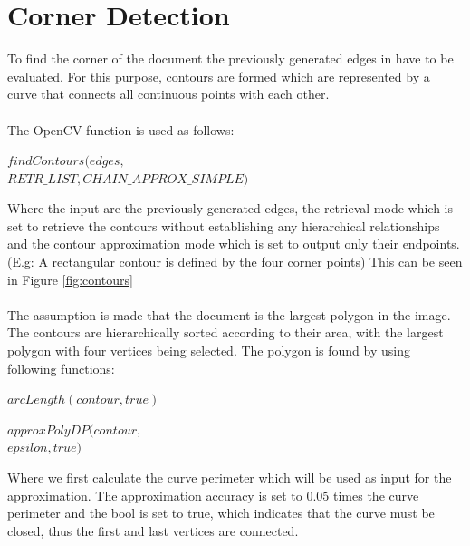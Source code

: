 \documentclass[twocolumn,10pt]{asme2ej}
\begin{document}
\section{Corner Detection}
\noindent
To find the corner of the document the previously generated edges 
in  have to be evaluated.
For this purpose, contours are formed which are represented by a curve that connects all 
continuous points with each other\cite{SUZUKI198532}.\\\\
\noindent
The OpenCV function\cite{opencv_findcontours} is used as follows:
\begin{center}
    \noindent
    $findContours(edges,$\\
    $RETR\_LIST, CHAIN\_APPROX\_SIMPLE)$
\end{center}
\noindent
Where the input are the previously generated edges, the retrieval 
mode\cite{opencv_retrievalmode} which is 
set to retrieve the contours without establishing any hierarchical relationships 
and the contour approximation mode\cite{opencv_approxmode} which is set to output only their endpoints.
(E.g: A rectangular contour is defined by the four corner points)
This can be seen in Figure \ref{fig:contours}\\\\
\noindent
The assumption is made that the document is the largest polygon in the image.
The contours are hierarchically sorted according to their area, with the largest polygon with four vertices being selected\cite{RAMER1972244}\cite{doi:10.3138/FM57-6770-U75U-7727}.
The polygon is found by using following functions\cite{opencv_approxpoly}\cite{opencv_arclength}:

\begin{center}
    \noindent
    $arcLength(contour,true)$
\end{center}

\begin{center}
    \noindent
    $approxPolyDP(contour,$\\
    $epsilon, true)$
\end{center}
\noindent
Where we first calculate the curve perimeter which will be used as 
input for the approximation. 
The approximation accuracy is set to $0.05$ times the curve perimeter and 
the bool is set to true, which indicates that the curve must be closed, thus the first and last vertices are connected.
\end{document}
